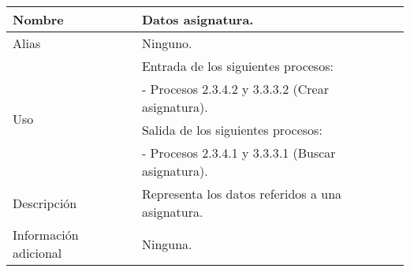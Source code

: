 \begin{center}
  \begin{tabular}{| l | p{9cm} |}
    \hline
    Nombre & \textbf{Datos asignatura}.\\
    \hline
    Alias & Ninguno.\\
    \hline
    \multirow{4}{*}{Uso} & Entrada de los siguientes procesos:\\
                         & - Procesos 2.3.4.2 y 3.3.3.2 (Crear asignatura).\\
                         & Salida de los siguientes procesos:\\
                         & - Procesos 2.3.4.1 y 3.3.3.1 (Buscar asignatura).\\
    \hline
    Descripción & Representa los datos referidos a una asignatura.\\
    \hline
    Información adicional & Ninguna.\\
    \hline
  \end{tabular}
\end{center}
